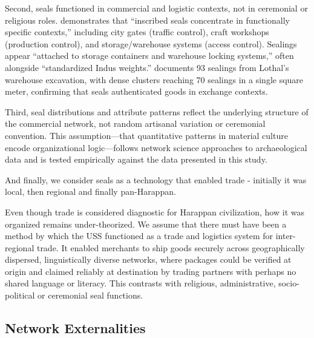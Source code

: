 \documentclass[12pt]{article}
\begin{document}
Second, seals functioned in commercial and logistic contexts, not in ceremonial 
or religious roles. \citet{mukhopadhyay2023} demonstrates that ``inscribed seals 
concentrate in functionally specific contexts,'' including city gates (traffic control), 
craft workshops (production control), and storage/warehouse systems (access control). 
Sealings appear ``attached to storage containers and warehouse locking systems,'' 
often alongside ``standardized Indus weights.'' \citet{frenez2024} documents 93 sealings 
from Lothal's warehouse excavation, with dense clusters reaching 70 sealings in a 
single square meter, confirming that seals authenticated goods in exchange contexts.

Third, seal distributions and attribute patterns reflect the underlying structure 
of the commercial network, not random artisanal variation or ceremonial convention. 
This assumption---that quantitative patterns in material culture encode organizational 
logic---follows network science approaches to archaeological data and is tested 
empirically against the data presented in this study.

And finally, we consider seals as a technology that enabled trade - initially it
was local, then regional and finally pan-Harappan.

Even though trade is considered diagnostic for Harappan civilization, how it was
organized remains under-theorized. We assume that there must have been a method
by which the USS functioned as a trade and logistics system for inter-regional trade.
It enabled merchants to ship goods securely across geographically dispersed, 
linguistically diverse networks, where packages could be verified at origin and 
claimed reliably at destination by trading partners with perhaps no shared language
or literacy. This contrasts with religious, administrative, socio-political or
ceremonial seal functions.


\subsection{Network Externalities}
\end{document}
